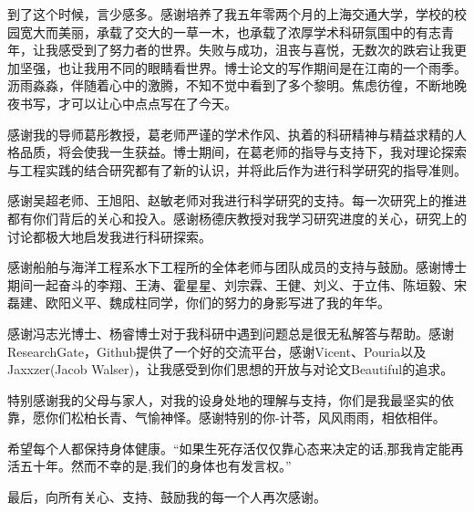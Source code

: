 \begin{thanks}

到了这个时候，言少感多。感谢培养了我五年零两个月的上海交通大学，学校的校园宽大而美丽，承载了交大的一草一木，也承载了浓厚学术科研氛围中的有志青年，让我感受到了努力者的世界。失败与成功，沮丧与喜悦，无数次的跌宕让我更加坚强，也让我用不同的眼睛看世界。博士论文的写作期间是在江南的一个雨季。沥雨淼淼，伴随着心中的激腾，不知不觉中看到了多个黎明。焦虑彷徨，不断地晚夜书写，才可以让心中点点写在了今天。

感谢我的导师葛彤教授，葛老师严谨的学术作风、执着的科研精神与精益求精的人格品质，将会使我一生获益。博士期间，在葛老师的指导与支持下，我对理论探索与工程实践的结合研究都有了新的认识，并将此后作为进行科学研究的指导准则。

感谢吴超老师、王旭阳、赵敏老师对我进行科学研究的支持。每一次研究上的推进都有你们背后的关心和投入。感谢杨德庆教授对我学习研究进度的关心，研究上的讨论都极大地启发我进行科研探索。

感谢船舶与海洋工程系水下工程所的全体老师与团队成员的支持与鼓励。感谢博士期间一起奋斗的李翔、王涛、霍星星、刘宗霖、王健、刘义、于立伟、陈垣毅、宋磊建、欧阳义平、魏成柱同学，你们的努力的身影写进了我的年华。

感谢冯志光博士、杨睿博士对于我科研中遇到问题总是很无私解答与帮助。感谢ResearchGate，Github提供了一个好的交流平台，感谢Vicent、Pouria以及Jaxxzer(Jacob Walser)，让我感受到你们思想的开放与对论文Beautiful的追求。

特别感谢我的父母与家人，对我的设身处地的理解与支持，你们是我最坚实的依靠，愿你们松柏长青、气愉神怿。感谢特别的你-计苓，风风雨雨，相依相伴。

希望每个人都保持身体健康。“如果生死存活仅仅靠心态来决定的话,那我肯定能再活五十年。然而不幸的是,我们的身体也有发言权。”

最后，向所有关心、支持、鼓励我的每一个人再次感谢。


\end{thanks}
